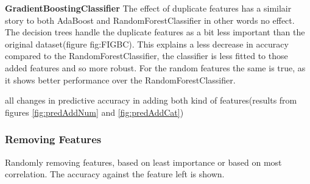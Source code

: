 \documentclass[a4paper,10pt]{article}
\begin{document}
\textbf{GradientBoostingClassifier} The effect of duplicate features has a similair story to both AdaBoost and RandomForestClassifier in other words no effect. The decision trees handle the duplicate features as a bit less important than the original dataset(figure {fig:FIGBC}). This explains a less decrease in accuracy compared to the RandomForestClassifier, the classifier is less fitted to those added features and so more robust. For the random features the same is true, as it shows better performance over the RandomForestClassifier. \\

\begin{table}[h]
	\centering
	\caption{all changes in predictive accuracy in adding both kind of features(results from figures \ref{fig:predAddNum} and \ref{fig:predAddCat})}\label{table:fluc}
\end{table}
\newpage

\subsubsection{Removing Features}
Randomly removing features, based on least importance or based on most correlation. The accuracy against the feature left is shown. 
\end{document}
